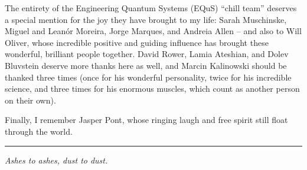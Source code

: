 The entirety of the Engineering Quantum Systems (EQuS) ``chill team'' deserves a special mention for the joy they have brought to my life:
%
Sarah Muschinske, Miguel and Lean\'or Moreira, Jorge Marques, and Andreia Allen -- and also to Will Oliver, whose incredible positive and guiding influence has brought these wonderful, brilliant people together.  %
%
David Rower, Lamia Ateshian, and Dolev Bluvstein deserve more thanks here as well, and Marcin Kalinowski should be thanked three times (once for his wonderful personality, twice for his incredible science, and three times for his enormous muscles, which count as another person on their own).


Finally, I remember Jasper Pont, whose ringing laugh and free spirit still float through the world.

\vspace{12pt}
\hrule

\begin{center}
    \textit{Ashes to ashes, dust to dust.}
\end{center}
